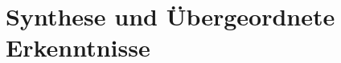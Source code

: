 \label{subsubsec:regulation_essential}

\section{Synthese und Übergeordnete Erkenntnisse}
\label{sec:synthesis}


\label{subsec:realistic_assessment}

\label{subsubsec:middle_position}

\label{subsubsec:system_questions}

\label{subsec:use_vs_need}

